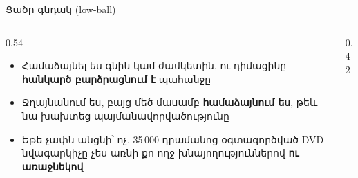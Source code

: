 \begin{frame}{Ցածր գնդակ (low-ball)}
  \begin{columns}[c]
    \begin{column}{0.54\textwidth}
      \begin{itemize}
        \item Համաձայնել ես գնին կամ ժամկետին, ու դիմացինը \textbf{հանկարծ բարձրացնում է} պահանջը
        \item Ջղայնանում ես, բայց մեծ մասամբ \textbf{համաձայնում ես}, թեև նա խախտեց պայմանավորվածությունը
        \item<2-> Եթե չափն անցնի՝ ոչ. 35\,000 դրամանոց օգտագործված DVD նվագարկիչը չես առնի քո ողջ խնայողություններով \textbf{ու առաջնեկով}
      \end{itemize}
    \end{column}
    \begin{column}{0.42\textwidth}
    \end{column}
  \end{columns}
\end{frame}

